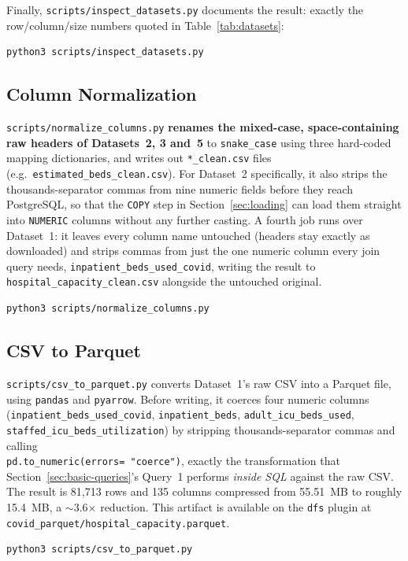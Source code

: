 \documentclass[11pt,a4paper]{article}
\begin{document}
Finally, \texttt{scripts/inspect\_datasets.py} documents the result:  exactly the
row/column/size numbers quoted in Table~\ref{tab:datasets}:

\begin{lstlisting}[style=bashstyle]
python3 scripts/inspect_datasets.py 
\end{lstlisting}

\subsection{Column Normalization}
\texttt{scripts/normalize\_columns.py} \textbf{renames the mixed-case, space-containing raw
headers of Datasets~2, 3 and~5} to \texttt{snake\_case} using three hard-coded mapping
dictionaries, and writes out \texttt{*\_clean.csv} files (e.g.\
\texttt{estimated\_beds\_clean.csv}). For Dataset~2 specifically, it also strips the
thousands-separator commas from nine numeric fields before they reach PostgreSQL, so
that the \texttt{COPY} step in Section~\ref{sec:loading} can load them straight into
\texttt{NUMERIC} columns without any further casting. A fourth job runs over
Dataset~1: it leaves every column name untouched (headers stay exactly as
downloaded) and strips commas from just the one numeric column every join query
needs, \texttt{inpatient\_beds\_used\_covid}, writing the result to
\texttt{hospital\_capacity\_clean.csv} alongside the untouched original.
\begin{lstlisting}[style=bashstyle]
python3 scripts/normalize_columns.py
\end{lstlisting}

\subsection{CSV to Parquet}
\texttt{scripts/csv\_to\_parquet.py} converts Dataset~1's raw CSV into a Parquet file, using \texttt{pandas} and \texttt{pyarrow}. Before
writing, it coerces four numeric columns\\
(\texttt{inpatient\_beds\_used\_covid}, \texttt{inpatient\_beds},
\texttt{adult\_icu\_beds\_used}, \\ \texttt{staffed\_icu\_beds\_utilization}) by
stripping thousands-separator commas and calling \\ \texttt{pd.to\_numeric(errors=
"coerce")}, exactly the transformation that Section~\ref{sec:basic-queries}'s Query~1
performs \emph{inside SQL} against the raw CSV. The result is 81{,}713 rows and 135
columns compressed from 55.51~MB to roughly 15.4~MB, a
$\sim$3.6$\times$ reduction. This artifact is available on the \texttt{dfs} plugin at
\texttt{covid\_parquet/hospital\_capacity.parquet}.
\begin{lstlisting}[style=bashstyle]
python3 scripts/csv_to_parquet.py
\end{lstlisting}
\end{document}
